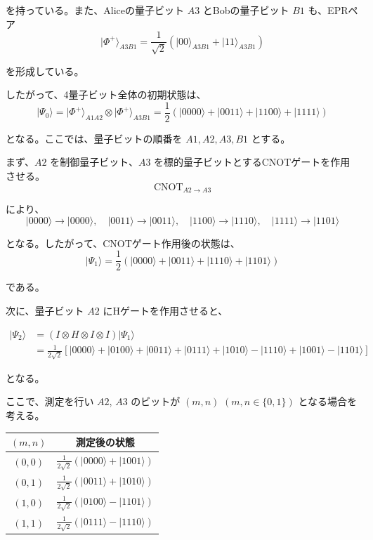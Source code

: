 \documentclass[11pt,a4paper]{ltjsarticle}
\begin{document}
を持っている。また、Aliceの量子ビット $A3$ とBobの量子ビット $B1$ も、EPRペア
\[
\lvert \Phi^+ \rangle_{A3B1}
= \frac{1}{\sqrt{2}}
\left(
\lvert 00 \rangle_{A3B1} + \lvert 11 \rangle_{A3B1}
\right)
\]

を形成している。

したがって、4量子ビット全体の初期状態は、
\[
\lvert \Psi_0 \rangle
= \lvert \Phi^+ \rangle_{A1A2} \otimes \lvert \Phi^+ \rangle_{A3B1}
= \frac{1}{2}
\left(
\lvert 0000 \rangle + \lvert 0011 \rangle + \lvert 1100 \rangle + \lvert 1111 \rangle
\right)
\]

となる。ここでは、量子ビットの順番を $A1, A2, A3, B1$ とする。

まず、$A2$ を制御量子ビット、$A3$ を標的量子ビットとするCNOTゲートを作用させる。
\[
\mathrm{CNOT}_{A2 \to A3}
\]

により、
\[
\lvert 0000 \rangle \to \lvert 0000 \rangle,\quad
\lvert 0011 \rangle \to \lvert 0011 \rangle,\quad
\lvert 1100 \rangle \to \lvert 1110 \rangle,\quad
\lvert 1111 \rangle \to \lvert 1101 \rangle
\]

となる。したがって、CNOTゲート作用後の状態は、
\[
\lvert \Psi_1 \rangle
= \frac{1}{2}
\left(
\lvert 0000 \rangle + \lvert 0011 \rangle + \lvert 1110 \rangle + \lvert 1101 \rangle
\right)
\]

である。

次に、量子ビット $A2$ にHゲートを作用させると、

\begin{align*}
\lvert \Psi_2 \rangle
&= (I \otimes H \otimes I \otimes I)\lvert \Psi_1 \rangle \\
&= \frac{1}{2\sqrt{2}}
\left[
\lvert 0000 \rangle + \lvert 0100 \rangle
+ \lvert 0011 \rangle + \lvert 0111 \rangle
+ \lvert 1010 \rangle - \lvert 1110 \rangle
+ \lvert 1001 \rangle - \lvert 1101 \rangle
\right]
\end{align*}

となる。

ここで、測定を行い $A2$, $A3$ のビットが $(m,n)$ $(m,n \in \{0,1\})$ となる場合を考える。

\begin{center}
\begingroup
\renewcommand{\arraystretch}{1.4}
\setlength{\tabcolsep}{14pt}
\begin{tabular}{c c}
\hline
\((m,n)\) & 測定後の状態 \\
\hline
\((0,0)\) & $\frac{1}{2\sqrt{2}}\left(\lvert 0000 \rangle + \lvert 1001 \rangle\right)$ \\
\((0,1)\) & $\frac{1}{2\sqrt{2}}\left(\lvert 0011 \rangle + \lvert 1010 \rangle\right)$ \\
\((1,0)\) & $\frac{1}{2\sqrt{2}}\left(\lvert 0100 \rangle - \lvert 1101 \rangle\right)$ \\
\((1,1)\) & $\frac{1}{2\sqrt{2}}\left(\lvert 0111 \rangle - \lvert 1110 \rangle\right)$ \\
\hline
\end{tabular}
\endgroup
\end{center}
\end{document}
